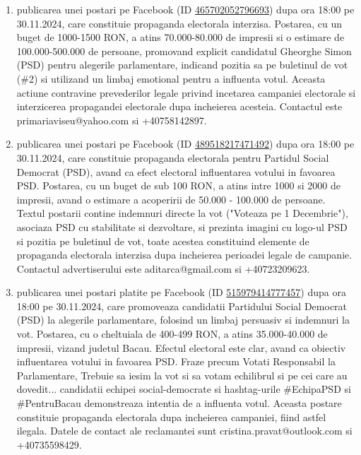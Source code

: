 \documentclass[a4paper,12pt]{article}
\begin{document}
\begin{enumerate}[leftmargin=*, label=\arabic*.)]
    \item publicarea unei postari pe Facebook (ID \href{https://www.facebook.com/ads/library/?id=465702052796693}{465702052796693}) dupa ora 18:00 pe 30.11.2024, care constituie propaganda electorala interzisa. Postarea, cu un buget de 1000-1500 RON, a atins 70.000-80.000 de impresii si o estimare de 100.000-500.000 de persoane, promovand explicit candidatul Gheorghe Simon (PSD) pentru alegerile parlamentare, indicand pozitia sa pe buletinul de vot (\#2) si utilizand un limbaj emotional pentru a influenta votul.  Aceasta actiune contravine prevederilor legale privind incetarea campaniei electorale si interzicerea propagandei electorale dupa incheierea acesteia.  Contactul este primariaviseu@yahoo.com si +40758142897.
    \item publicarea unei postari pe Facebook (ID \href{https://www.facebook.com/ads/library/?id=489518217471492}{489518217471492}) dupa ora 18:00 pe 30.11.2024, care constituie propaganda electorala pentru Partidul Social Democrat (PSD), avand ca efect electoral influentarea votului in favoarea PSD. Postarea, cu un buget de sub 100 RON, a atins intre 1000 si 2000 de impresii, avand o estimare a acoperirii de 50.000 - 100.000 de persoane.  Textul postarii contine indemnuri directe la vot ("Voteaza pe 1 Decembrie"), asociaza PSD cu stabilitate si dezvoltare, si prezinta imagini cu logo-ul PSD si pozitia pe buletinul de vot, toate acestea constituind elemente de propaganda electorala interzisa dupa incheierea perioadei legale de campanie.  Contactul advertiserului este aditarca@gmail.com si +40723209623.
    \item publicarea unei postari platite pe Facebook (ID \href{https://www.facebook.com/ads/library/?id=515979414777457}{515979414777457}) dupa ora 18:00 pe 30.11.2024, care promoveaza candidatii Partidului Social Democrat (PSD) la alegerile parlamentare, folosind un limbaj persuasiv si indemnuri la vot. Postarea, cu o cheltuiala de 400-499 RON, a atins 35.000-40.000 de impresii, vizand judetul Bacau.  Efectul electoral este clar, avand ca obiectiv influentarea votului in favoarea PSD. Fraze precum Votati Responsabil la Parlamentare, Trebuie sa iesim la vot si sa votam echilibrul si pe cei care au dovedit... candidatii echipei social-democrate si hashtag-urile \#EchipaPSD si \#PentruBacau demonstreaza intentia de a influenta votul.  Aceasta postare constituie propaganda electorala dupa incheierea campaniei, fiind astfel ilegala.  Datele de contact ale reclamantei sunt cristina.pravat@outlook.com si +40735598429.

\end{enumerate}
\end{document}
